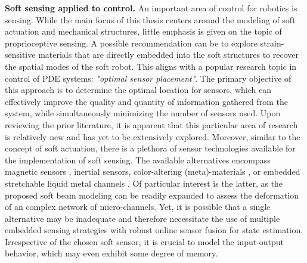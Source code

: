 \textbf{Soft sensing applied to control.} An important area of control for robotics is sensing. While the main focus of this thesis centers around the modeling of soft actuation and mechanical structures, little emphasis is given on the topic of proprioceptive sensing. A possible recommendation can be to explore strain-sensitive materials that are directly embedded into the soft structures to recover the spatial modes of the soft robot. This aligns with a popular research topic in control of PDE systems: \textit{"optimal sensor placement"}. The primary objective of this approach is to determine the optimal location for sensors, which can effectively improve the quality and quantity of information gathered from the system, while simultaneously minimizing the number of sensors used. Upon reviewing the prior literature, it is apparent that this particular area of research is relatively new and has yet to be extensively explored. Moreover, similar to the concept of soft actuation, there is a plethora of sensor technologies available for the implementation of soft sensing. The available alternatives encompass magnetic sensors \cite{Felt2015Oct,Felt2019Feb,Baaij2023}, inertial sensors, color-altering (meta)-materials \cite{Scharff2019Jul}, or embedded stretchable liquid metal channels \cite{Park2012,Tapia2020}. Of particular interest is the latter, as the proposed soft beam modeling can be readily expanded to assess the deformation of an complex network of micro-channels. Yet, it is possible that a single alternative may be inadequate and therefore necessitate the use of multiple embedded sensing strategies with robust online sensor fusion for state estimation. Irrespective of the chosen soft sensor, it is crucial to model the input-output behavior, which may even exhibit some degree of memory.



